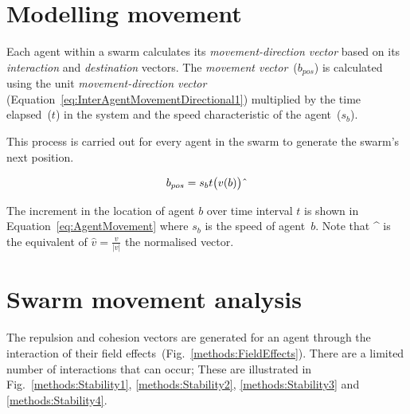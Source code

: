 \documentclass{ieeeaccess}
\begin{document}

\section{Modelling movement}\label{Section::Movement1}
Each agent within a swarm calculates its \textit{movement-direction vector}
based on its \textit{interaction} and \textit{destination} vectors. The
\textit{movement vector}~($b_{pos}$) is calculated using the unit
\textit{movement-direction vector}
(Equation~\ref{eq:InterAgentMovementDirectional1}) multiplied by the time
elapsed~($t$) in the system and the speed characteristic of the agent~($s_b$).

This process is carried out for every agent in the swarm to generate the
swarm's next position.

\begin{center}
\begin{equation}
\label{eq:AgentMovement}
b_{pos}=s_{b}t\big(v(b)\big)\string^ 
\end{equation}
\end{center}

The increment in the location of agent $b$ over time interval $t$ is shown in
Equation~\ref{eq:AgentMovement} where $s_b$ is the speed of agent~$b$. Note
that \string^ is the equivalent of $\hat{v} = \frac{v}{|v|}$ the normalised
vector.

\section{Swarm movement analysis\label{metric:MagnitudeDynamics2}}
The repulsion and cohesion vectors are generated for an agent through the
interaction of their field effects~(Fig.~\ref{methods:FieldEffects}). There are
a limited number of interactions that can occur; These are illustrated in
Fig.~\ref{methods:Stability1}, \ref{methods:Stability2},
\ref{methods:Stability3} and \ref{methods:Stability4}.
\end{document}

